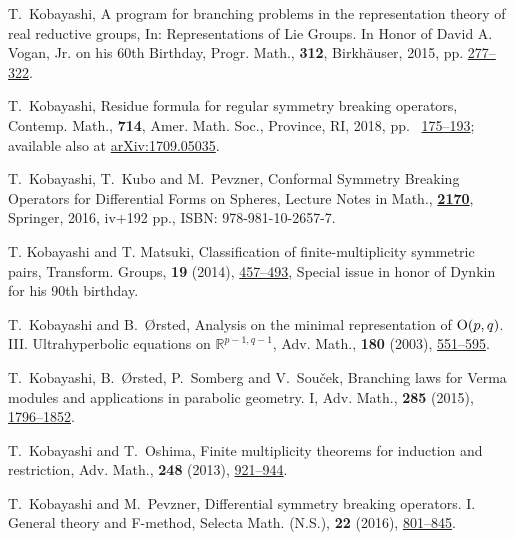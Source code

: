 \begin{thebibliography}{M}
T.~Kobayashi,
A program for branching problems in the representation theory of real reductive groups,
In: Representations of Lie Groups. In Honor of David A. Vogan, Jr. on his 60th Birthday,
Progr. Math., {\bf{312}}, Birkh{\"a}user, 2015, pp.
\href{http://dx.doi.org/10.1007/978-3-319-23443-4_10}
{277--322}.

T.~Kobayashi,
Residue formula for regular symmetry breaking operators,
Contemp. Math., {\bf{714}}, Amer. Math. Soc.,
Province, RI, 2018, pp.~
\href{http://doi.org/10.1090/com/714/14380}
{175--193};
available also at 
\href{http://arxiv.org/abs/1709.05035}
{arXiv:1709.05035}.  

T.~Kobayashi, T.~Kubo and M.~Pevzner,
Conformal Symmetry Breaking Operators for Differential Forms on Spheres,
Lecture Notes in Math., 
\href{http://dx.doi.org/10.1007/978-981-10-2657-7}
{{\bf{2170}}}, Springer, 2016, iv+192 pp., ISBN: 978-981-10-2657-7.

T. Kobayashi and T. Matsuki,
Classification of finite-multiplicity symmetric pairs,
Transform. Groups, {\bf{19}} (2014), 
\href{http://dx.doi.org/10.1007/s00031-014-9265-x}
{457--493},
Special issue in honor of Dynkin for his 90th birthday.

T.~Kobayashi and B.~{\O}rsted,
{Analysis on the minimal representation of
{${\rm O}(p,q)$}. {\rm{III}}.
Ultrahyperbolic equations on $\mathbb{R}^{p-1,q-1}$},
Adv. Math., \textbf{180} (2003), 
\href{http://dx.doi.org/10.1016/S0001-8708(03)00014-8}{551--595}.

T.~Kobayashi, B.~{\O}rsted, P.~Somberg and V.~Sou\v{c}ek,
Branching laws for Verma modules and applications in parabolic geometry. I,
Adv. Math., {\bf{285}} (2015),
\href{http://dx.doi.org/10.1016/j.aim.2015.08.020}
{1796--1852}.

T.~Kobayashi and T.~Oshima,
Finite multiplicity theorems for induction and restriction,
Adv. Math., {\bf{248}} (2013),
\href{http://dx.doi.org/10.1016/j.aim.2013.07.015}
{921--944}.

T.~Kobayashi and M.~Pevzner,
Differential symmetry breaking operators. I.
General theory and F-method,
Selecta Math. (N.S.), {\bf{22}} (2016),
\href{http://dx.doi.org/10.1007/s00029-015-0207-9}
{801--845}.


\end{thebibliography}
